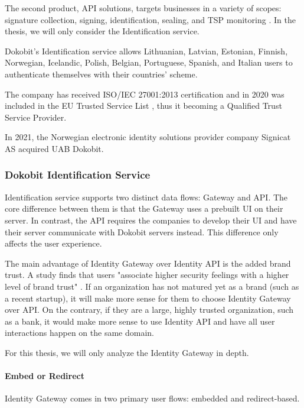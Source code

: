 The second product, API solutions, targets businesses in a variety of scopes: signature collection, signing, identification, sealing, and TSP monitoring \cite{dokobit}. In the thesis, we will only consider the Identification service.

Dokobit's Identification service allows Lithuanian, Latvian, Estonian, Finnish, Norwegian, Icelandic, Polish, Belgian, Portuguese, Spanish, and Italian \cite{dokobit} users to authenticate themselves with their countries' scheme.

The company has received ISO/IEC 27001:2013 certification \cite{dokobit-certification} and in 2020 was included in the EU Trusted Service List \cite{eu-trustservices, dokobit-aboutus}, thus it becoming a Qualified Trust Service Provider.

In 2021, the Norwegian electronic identity solutions provider company Signicat AS acquired UAB Dokobit.

\subsubsection{Dokobit Identification Service}

Identification service supports two distinct data flows: Gateway and API. The core difference between them is that the Gateway uses a prebuilt UI on their server. In contrast, the API requires the companies to develop their UI and have their server communicate with Dokobit servers instead. This difference only affects the user experience.

The main advantage of Identity Gateway over Identity API is the added brand trust. A study finds that users "associate higher security feelings with a higher level of brand trust" \cite{ha2004factors}. If an organization has not matured yet as a brand (such as a recent startup), it will make more sense for them to choose Identity Gateway over API. On the contrary, if they are a large, highly trusted organization, such as a bank, it would make more sense to use Identity API and have all user interactions happen on the same domain.

For this thesis, we will only analyze the Identity Gateway in depth.

\paragraph{Embed or Redirect}

Identity Gateway comes in two primary user flows: embedded and redirect-based.

